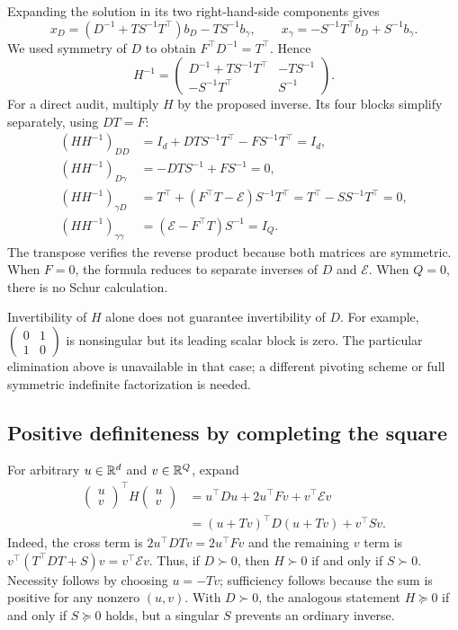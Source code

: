 Expanding the solution in its two right-hand-side components gives
\[
 x_D=(D^{-1}+TS^{-1}T^\top)b_D-TS^{-1}b_\gamma,\qquad
 x_\gamma=-S^{-1}T^\top b_D+S^{-1}b_\gamma .
\]
We used symmetry of $D$ to obtain $F^\top D^{-1}=T^\top$.
Hence
\begin{equation}
 H^{-1}=
 \begin{pmatrix}
 D^{-1}+TS^{-1}T^\top&-TS^{-1}\\
 -S^{-1}T^\top&S^{-1}
 \end{pmatrix}.
 \label{cov-inverse-formula}
\end{equation}
For a direct audit, multiply $H$ by the proposed inverse.  Its four
blocks simplify separately, using $DT=F$:
\begin{align}
 (HH^{-1})_{DD}
 &=I_d+DTS^{-1}T^\top-FS^{-1}T^\top=I_d,\\
 (HH^{-1})_{D\gamma}
 &=-DTS^{-1}+FS^{-1}=0,\\
 (HH^{-1})_{\gamma D}
 &=T^\top+(F^\top T-\mathcal E)S^{-1}T^\top
   =T^\top-SS^{-1}T^\top=0,\\
 (HH^{-1})_{\gamma\gamma}
 &=(\mathcal E-F^\top T)S^{-1}=I_Q .
\end{align}
The transpose verifies the reverse product because both matrices are
symmetric.  When $F=0$, the formula reduces to separate inverses of
$D$ and $\mathcal E$.  When $Q=0$, there is no Schur calculation.

Invertibility of $H$ alone does not guarantee invertibility of $D$.
For example,
$\left(\begin{smallmatrix}0&1\\1&0\end{smallmatrix}\right)$
is nonsingular but its leading scalar block is zero.  The particular
elimination above is unavailable in that case; a different pivoting
scheme or full symmetric indefinite factorization is needed.

\subsection{Positive definiteness by completing the square}
\label{cov-schur-positive}

For arbitrary $u\in\mathbb R^d$ and $v\in\mathbb R^Q$, expand
\begin{align}
 \begin{pmatrix}u\\v\end{pmatrix}^{\!\top}
 H\begin{pmatrix}u\\v\end{pmatrix}
 &=u^\top Du+2u^\top Fv+v^\top\mathcal E v\\
 &=(u+Tv)^\top D(u+Tv)+v^\top Sv .
 \label{cov-completed-square}
\end{align}
Indeed, the cross term is $2u^\top DTv=2u^\top Fv$ and the
remaining $v$ term is
$v^\top(T^\top DT+S)v=v^\top\mathcal E v$.
Thus, if $D\succ0$, then $H\succ0$ if and only if $S\succ0$.
Necessity follows by choosing $u=-Tv$; sufficiency follows because
the sum is positive for any nonzero $(u,v)$.  With $D\succ0$,
the analogous statement $H\succeq0$ if and only if $S\succeq0$
holds, but a singular $S$ prevents an ordinary inverse.


